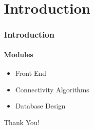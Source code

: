 \documentclass{beamer}
\begin{document}
\section{Introduction}

\begin{frame}
  \frametitle{Introduction}
  \framesubtitle{Modules}
  \begin{itemize}
    \item Front End
    \vspace{10pt}
    \item Connectivity Algorithms
    \vspace{10pt}
    \item Database Design
    \vspace{10pt}
    
  \end{itemize}
\end{frame}













{
\begin{frame}[plain]
  \centering
  \Huge{Thank You!}
\end{frame}
}
\end{document}
